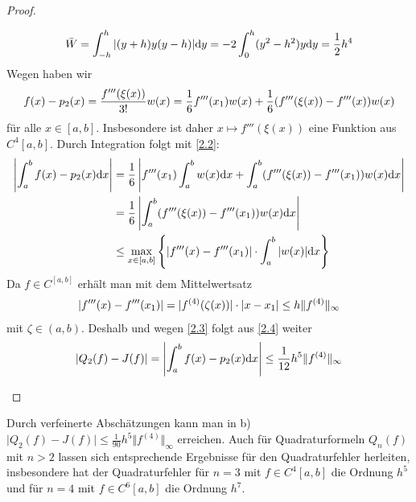 \begin{proof}
\begin{enumerate}[label=(\alph*)]
\begin{align}
		\label{2.3}
			\overline{W}=\int_{-h}^{h}\vert (y+h)y(y-h)\vert\diff y=-2\int_{0}^{h} (y^2-h^2)y\diff y=\frac{1}{2}h^4
		\end{align}
		Wegen  haben wir
		\begin{align}
			f(x)-p_2(x)=\frac{f'''(\xi(x))}{3!}w(x)=\frac{1}{6}f'''(x_1)w(x)+\frac{1}{6}(f'''(\xi(x))-f'''(x))w(x)\notag
		\end{align}
		für alle $x\in[a,b]$. Insbesondere ist daher $x\mapsto f'''(\xi(x))$ eine Funktion aus $C^4[a,b]$. Durch Integration folgt mit \cref{2.2}:
		\begin{align}
			\label{2.4}
			\begin{split}
				\left|\int_a^b f(x)-p_2(x)\mathrm{d} x\right| &= \frac{1}{6}\left|f'''(x_1)\int_a^b w(x)\mathrm{d} x+\int_a^b (f'''(\xi(x))-f'''(x_1))w(x)\mathrm{d} x\right| \\
				&= \frac{1}{6}\left|\int_a^b (f'''(\xi(x))-f'''(x_1))w(x)\mathrm{d} x\right| \\
				&\le \max_{x\in [a,b]}\left\lbrace\left|f'''(x)-f'''(x_1)\right|\cdot\int_a^b\vert w(x)\vert\mathrm{d} x\right\rbrace
			\end{split}
		\end{align}
		Da $f\in C^[a,b]$ erhält man mit dem Mittelwertsatz
		\begin{align}
			\vert f'''(x)-f'''(x_1)\vert = \vert f^{(4)}(\zeta(x))\vert\cdot\vert x-x_1\vert\le h\Vert f^{(4)}\Vert_\infty\notag
		\end{align}
		mit $\zeta\in (a,b)$. Deshalb und wegen \cref{2.3} folgt aus \cref{2.4} weiter
		\begin{align}
			\vert Q_2(f)-J(f)\vert =\left|\int_a^b f(x)-p_2(x)\mathrm{d} x\right|\le\frac{1}{12}h^5\Vert f^{(4)}\Vert_\infty
		\end{align}
	\end{enumerate}
\end{proof}

\begin{remark}
	Durch verfeinerte Abschätzungen kann man in  b) $\vert Q_2(f)-J(f)\vert\le \frac{1}{90}h^5\Vert f^{(4)}\Vert_\infty$ erreichen. Auch für Quadraturformeln $Q_n(f)$ mit $n>2$ lassen sich entsprechende Ergebnisse für den Quadraturfehler herleiten, insbesondere hat der Quadraturfehler für $n=3$ mit $f\in C^4[a,b]$ die Ordnung $h^5$ und für $n=4$ mit $f\in C^6[a,b]$ die Ordnung $h^7$.
\end{remark}